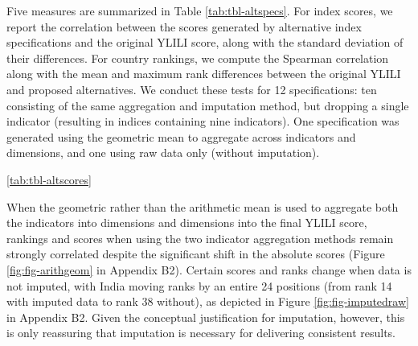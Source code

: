 \documentclass[
  a4paper, twoside, 12pt]{book}
\newcommand{\hlc}[2][color]{}
\begin{document}
Five measures are summarized in Table \ref{tab:tbl-altspecs}. For index scores, we report the correlation between the scores generated by alternative index specifications and the original YLILI score, along with the standard deviation of their differences. For country rankings, we compute the Spearman correlation along with the mean and maximum rank differences between the original YLILI and proposed alternatives. We conduct these tests for 12 specifications: ten consisting of the same aggregation and imputation method, but dropping a single indicator (resulting in indices containing nine indicators). One specification was generated using the geometric mean to aggregate across indicators and dimensions, and one using raw data only (without imputation).



\hlc[pink]{Scores and rankings for all countries were recalculated with the alternative specifications and are shown in Table} \ref{tab:tbl-altscores} \hlc[pink]{in Appendix B2. Scores and ranks remain highly correlated with the original YLILI when a single variable is dropped, indicating that the index is not overly dependent on the inclusion of any particular measure. Alternative specifications impact the countries in the middle of the index much more than those at the extremes. Neither score nor rank correlation drops below 0.9 for any of the alternative specifications studied. Removing the youth working poverty rate causes the largest overall changes in scores and reordering of rank, with countries changing rank by 4.3 positions on average.}

When the geometric rather than the arithmetic mean is used to aggregate both the indicators into dimensions and dimensions into the final YLILI score, rankings and scores when using the two indicator aggregation methods remain strongly correlated despite the significant shift in the absolute scores (Figure \ref{fig:fig-arithgeom} in Appendix B2). Certain scores and ranks change when data is not imputed, with India moving ranks by an entire 24 positions (from rank 14 with imputed data to rank 38 without), as depicted in Figure \ref{fig:fig-imputedraw} in Appendix B2. Given the conceptual justification for imputation, however, this is only reassuring that imputation is necessary for delivering consistent results.
\end{document}
